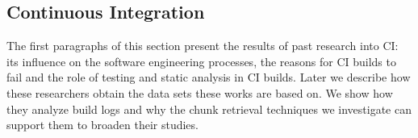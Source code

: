 \documentclass[\myrootdir/main.tex]{subfiles}
\begin{document}
\subsection{Continuous Integration}
The first paragraphs of this section present the results of past research into CI: its influence on the software engineering processes, the reasons for CI builds to fail and the role of testing and static analysis in CI builds.
Later we describe how these researchers obtain the data sets these works are based on.
We show how they analyze build logs and why the chunk retrieval techniques we investigate can support them to broaden their studies.
\end{document}
